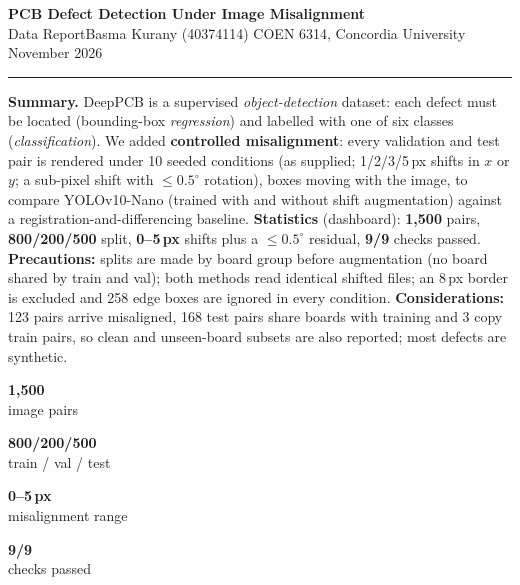 \documentclass[10pt,a4paper]{article}
\newcommand{\kpi}[2]{%
  \begin{tcolorbox}[colback=white,colframe=black,arc=0pt,boxrule=0.6pt,left=1pt,right=1pt,top=2pt,bottom=2pt,
                    width=\linewidth,height=1.15cm,valign=center,halign=center]
  {\large\bfseries\color{accent}#1}\\[1pt]{\scriptsize\color{muted}#2}
  \end{tcolorbox}}
\begin{document}
{\LARGE\bfseries PCB Defect Detection Under Image Misalignment}\\[1pt]
{\large Data Report}\hfill{\small Basma Kurany (40374114) \textperiodcentered{} COEN 6314, Concordia University
\textperiodcentered{} November 2026}\\[-5pt]
{\color{accent}\rule{\linewidth}{0.8pt}}

\textbf{Summary.} DeepPCB is a supervised \emph{object-detection} dataset: each defect must be located
(bounding-box \emph{regression}) and labelled with one of six classes (\emph{classification}). We added
\textbf{controlled misalignment}: every validation and test pair is rendered under 10 seeded conditions (as
supplied; 1/2/3/5\,px shifts in $x$ or $y$; a sub-pixel shift with $\leq0.5^\circ$ rotation), boxes moving with the
image, to compare YOLOv10-Nano (trained with and without shift augmentation) against a registration-and-differencing
baseline. \textbf{Statistics} (dashboard): \textbf{1,500} pairs, \textbf{800/200/500} split, \textbf{0--5\,px}
shifts plus a $\leq0.5^\circ$ residual, \textbf{9/9} checks passed.
\textbf{Precautions:} splits are made by board group before augmentation (no board shared by train and val); both
methods read identical shifted files; an 8\,px border is excluded and 258 edge boxes are ignored in every condition.
\textbf{Considerations:} 123 pairs arrive misaligned, 168 test pairs share boards with training and 3 copy train
pairs, so clean and unseen-board subsets are also reported; most defects are synthetic.

\vspace{1pt}\noindent
\begin{minipage}[t]{0.235\linewidth}\kpi{1,500}{image pairs}\end{minipage}\hfill
\begin{minipage}[t]{0.235\linewidth}\kpi{800/200/500}{train / val / test}\end{minipage}\hfill
\begin{minipage}[t]{0.235\linewidth}\kpi{0--5\,px}{misalignment range}\end{minipage}\hfill
\begin{minipage}[t]{0.235\linewidth}\kpi{9/9}{checks passed}\end{minipage}
\end{document}
